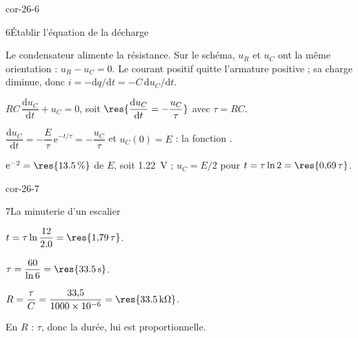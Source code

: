 \begin{blocLivre}{cor-26-6}
\begin{corrige}{6}{Établir l'équation de la décharge}
\begin{questions}
\item Le condensateur alimente la résistance. Sur le schéma, $u_R$ et $u_C$ ont la même orientation : $u_R-u_C=0$. Le courant positif quitte l’armature positive ; sa charge diminue, donc $i=-\mathrm{d}q/\mathrm{d}t=-C\,\mathrm{d}u_C/\mathrm{d}t$.
\item $RC\,\dfrac{\mathrm{d}u_C}{\mathrm{d}t}+u_C=0$, soit $\res{\dfrac{\mathrm{d}u_C}{\mathrm{d}t}=-\dfrac{u_C}{\tau}}$ avec $\tau=RC$.
\item $\dfrac{\mathrm{d}u_C}{\mathrm{d}t}=-\dfrac{E}{\tau}\,\mathrm{e}^{-t/\tau}=-\dfrac{u_C}{\tau}$ et $u_C(0)=E$ : la fonction .
\item $\mathrm{e}^{-2}=\res{\qty{13,5}{\percent}}$ de $E$, soit \qty{1,22}{V} ; $u_C=E/2$ pour $t=\tau\ln2=\res{0{,}69\,\tau}$.
\end{questions}
\end{corrige}
\end{blocLivre}
\begin{blocLivre}{cor-26-7}
\begin{corrige}{7}{La minuterie d'un escalier}
\begin{questions}
\item $t=\tau\ln\dfrac{12}{2{,}0}=\res{1{,}79\,\tau}$.
\item $\tau=\dfrac{60}{\ln6}=\res{\qty{33,5}{s}}$.
\item $R=\dfrac{\tau}{C}=\dfrac{33{,}5}{\num{1000e-6}}=\res{\qty{33,5}{k\ohm}}$.
\item En  $R$ : $\tau$, donc la durée, lui est proportionnelle.
\end{questions}
\end{corrige}
\end{blocLivre}
